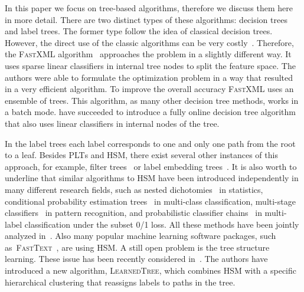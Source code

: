 \documentclass{article}
\newcommand{\Algo}[1]{\textsc{#1}}
\begin{document}
In this paper we focus on tree-based algorithms, therefore we discuss them here in more detail. 
There are two distinct types of these algorithms: decision trees and label trees. 
The former type follow the idea of classical decision trees. 
However, the direct use of the classic algorithms can be very costly~\citep{Agrawal_et_al_2013}. 
Therefore, the \Algo{FastXML} algorithm~\citep{Prabhu_Varma_2014} approaches the problem in a slightly different way. 
It uses sparse linear classifiers in internal tree nodes to split the feature space. 
The authors were able to formulate the optimization problem in a way that resulted in a very efficient algorithm. 
To improve the overall accuracy \Algo{FastXML} uses an ensemble of trees. 
This algorithm, as many other decision tree methods, works in a batch mode. 
\citet{Choromanska_Langford_2015} have succeeded to introduce a fully online decision tree algorithm 
that also uses linear classifiers in internal nodes of the tree.

In the label trees each label corresponds to one and only one path from the root to a leaf. 
Besides \Algo{PLT}s and \Algo{HSM}, there exist several other instances of this approach, 
for example, filter trees~\citep{Beygelzimer_et_al_2009a,Li_Lin_2014} 
or label embedding trees~\citep{Bengio_et_al_2010}. 
It is also worth to underline that similar algorithms to \Algo{HSM} 
have been introduced independently in many different research fields, 
such as nested dichotomies~\citep{Fox_1997} in statistics, 
conditional probability estimation trees~\citep{Beygelzimer_et_al_2009b} in multi-class classification, 
multi-stage classifiers~\citep{Kurzynski_1988} in pattern recognition, 
and probabilistic classifier chains~\citep{Dembczynski_et_al_2010c} in multi-label classification under the subset 0/1 loss. 
All these methods have been jointly analyzed in~\citep{Dembczynski_et_al_2016}.
Also many popular machine learning software packages, such as~\Algo{FastText}~\citep{Joulin_et_al_2016}, are using \Algo{HSM}.
A still open problem is the tree structure learning. 
These issue has been recently considered in~\citep{Jernite_et_al_2017}. %
The authors have introduced a new algorithm, \Algo{LearnedTree}, which combines \Algo{HSM} 
with a specific hierarchical clustering that reassigns labels to paths in the tree. 
\end{document}
